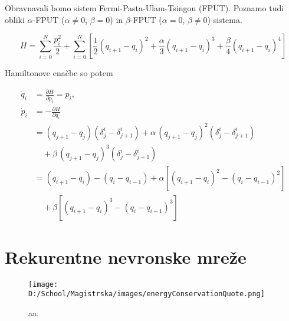 \documentclass[12pt,a4paper]{article}
\newcommand{\half}{\frac{1}{2}}
\newcommand{\pd}{\partial}
\newcommand{\Pd}[2]{\frac{\pd #1}{\pd #2}}
\numberwithin{equation}{section}
\begin{document}
Obravnavali bomo sistem Fermi-Pasta-Ulam-Tsingou (FPUT). Poznamo tudi obliki $\alpha$-FPUT ($\alpha \neq 0$, $\beta = 0$) in $\beta$-FPUT ($\alpha = 0$, $\beta \neq 0$) sistema.

\begin{equation}
	H = \sum_{i=0}^{N} \frac{p_i^2}{2}+ \sum_{i=0}^{N} \left[ \half (q_{i+1}-q_i)^2 + \frac{\alpha}{3} (q_{i+1}-q_i)^3 + \frac{\beta}{4} (q_{i+1}-q_i)^4 \right]
\end{equation}

Hamiltonove enačbe so potem

\begin{equation}
\begin{split}
	\dot{q}_i &= \Pd{H}{p_i}=p_i,\\ 
    \dot{p}_i &= -\Pd{H}{q_i} \\
    &=(q_{j+1}-q_j)(\delta^i_j-\delta^i_{j+1})+ \alpha \, (q_{j+1}-q_j)^2 (\delta^i_j-\delta^i_{j+1}) \\
    & \quad + \beta \, (q_{j+1}-q_j)^3 (\delta^i_j-\delta^i_{j+1}) \\
    &=(q_{i+1}-q_i) - (q_{i}-q_{i-1}) + \alpha \left[ (q_{i+1}-q_i)^2- (q_{i}-q_{i-1})^2 \right] \\
    &\quad + \beta \left[ (q_{i+1}-q_i)^3- (q_{i}-q_{i-1})^3 \right]
\end{split}
\end{equation}

\section{Rekurentne nevronske mreže}

\begin{figure}[H]
    \centering
    \texttt{[image: D:/School/Magistrska/images/energyConservationQuote.png]}
    \caption{aa.}
\end{figure}\par


% 
% 

%


\end{document}
